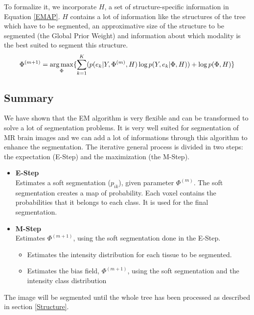 To formalize it, we incorporate $H$, a set of structure-specific information in Equation \ref{EMAP}. $H$ contains a lot of information like the structures of the tree which have to be segmented, an approximative size of the structure to be segmented (the Global Prior Weight) and information about which modality is the best suited to segment this structure.
\begin{equation*}
 \Phi^{(m+1)}=\operatorname*{arg\,max}_\Phi \{\sum_{k=1}^K   (p(e_{k}|Y,\Phi^{(m)},H)\operatorname*{log} p(Y,e_{k}|\Phi,H)) + \operatorname*{log} p(\Phi ,H) \} \\
\end{equation*}
 
\subsection{Summary}\label{SUMMARY}
We have shown that the EM algorithm is very flexible and can be transformed to solve a lot of segmentation problems. It is very well suited for segmentation of MR brain images and we can add a lot of informations through this algorithm to enhance the segmentation. The iterative general process is divided in two steps: the expectation (E-Step) and the maximization (the M-Step).

  \begin{itemize}
  \item \textbf{E-Step}\\  
  Estimates a soft segmentation ($p_{ik}$), given parameter $\Phi^{(m)}$. The soft segmentation creates a map of probability. Each voxel contains the probabilities that it belongs to each class. It is used for the final segmentation.
  
  \item \textbf{M-Step}\\
  Estimates $\Phi^{(m+1)}$, using the soft segmentation done in the E-Step.
  
    \begin{itemize}
    \item Estimates the intensity distribution for each tissue to be segmented.    
    \item Estimates the bias field, $\Phi^{(m+1)}$, using the soft segmentation and the intensity class distribution
    \end{itemize}
  \end{itemize}
  
The image will be segmented until the whole tree has been processed as described in section \ref{Structure}.

